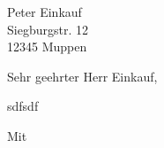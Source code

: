 \documentclass[brief]{scrlttr2}
\begin{document}
\begin{letter}
{Peter Einkauf\\
Siegburgstr. 12\\
12345 Muppen
}
\opening{Sehr geehrter Herr Einkauf,}
sdfsdf


\closing{Mit}
\end{letter}
\end{document}
